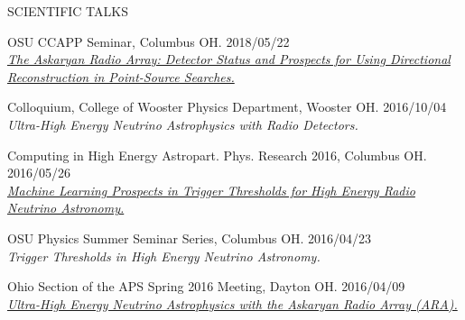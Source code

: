\documentclass{resume} %
\begin{document}
\begin{rSection}{SCIENTIFIC TALKS}
\begin{etaremune}
\item OSU CCAPP Seminar, Columbus OH. \hfill 2018/05/22 \\
\href{http://ccapp.osu.edu/pastseminars.html#past}{\textit{The Askaryan Radio Array: Detector Status and Prospects for Using Directional Reconstruction in Point-Source Searches.}}

\item Colloquium, College of Wooster Physics Department, Wooster OH. \hfill 2016/10/04 \\
{\em Ultra-High Energy Neutrino Astrophysics with Radio Detectors.}

\item Computing in High Energy Astropart. Phys. Research 2016, Columbus OH. \hfill 2016/05/26 \\
\href{http://ccapp.osu.edu/workshops/CHEAPR2016/workshop.html}{\em Machine Learning Prospects in Trigger Thresholds for High Energy Radio Neutrino Astronomy.}

\item OSU Physics Summer Seminar Series, Columbus OH. \hfill 2016/04/23 \\
{\em Trigger Thresholds in High Energy Neutrino Astronomy.} 

\item Ohio Section of the APS Spring 2016 Meeting, Dayton OH. \hfill 2016/04/09 \\
\href{http://meetings.aps.org/Meeting/OSS16/Session/D3.6}{\em Ultra-High Energy Neutrino Astrophysics with the Askaryan Radio Array (ARA).} 
\end{etaremune}


\end{rSection}
\end{document}
